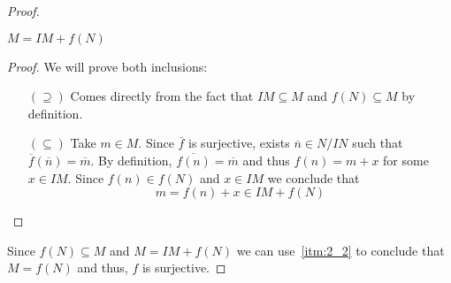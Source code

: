 \begin{problem}
\begin{enumerate}[label=(\theproblem.\arabic*),ref=\theproblem.\arabic*]
\begin{sol}
                \begin{proof}
                    \begin{claim}
                        $M = IM + f(N)$
                        \begin{proof}
                            We will prove both inclusions:
                            \begin{itemize}
                                \item[$(\supseteq)$] Comes directly from the fact that $IM \subseteq M$ and $f(N) \subseteq M$ by definition.
                                \item[$(\subseteq)$] Take $m \in M$.
                                Since $\overline{f}$ is surjective, exists $\overline{n} \in N/IN$ such that $\overline{f}(\overline{n}) = \overline{m}$.
                                By definition, $\overline{f(n)} = \overline{m}$ and thus $f(n) = m + x$ for some $x \in IM$.
                                Since $f(n) \in f(N)$ and $x \in IM$ we conclude that
                                \[
                                    m = f(n) + x \in IM + f(N)
                                \]
                            \end{itemize}
                        \end{proof}
                    \end{claim}
                    Since $f(N) \subseteq M$ and $M = IM + f(N)$ we can use~\ref{itm:2_2} to conclude that $M = f(N)$ and thus, $f$ is surjective.
                \end{proof}
            \end{sol}
    \end{enumerate}
\end{problem}